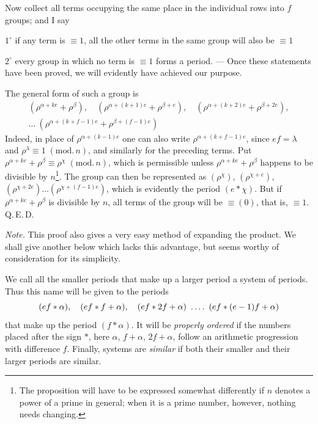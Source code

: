 Now collect all terms occupying the same place in the individual rows into $f$ groups; and I say
\par\noindent $1^\circ$ if any term is $\equiv1$, all the other terms in the same group will also be $\equiv1$

\noindent $2^\circ$ every group in which no term is $\equiv1$ forms a period. --- Once these statements have been proved, we will evidently have achieved our purpose.

The general form of such a group is
\[
\begin{gathered}
(\rho^{\alpha+ke}+\rho^\beta),\quad(\rho^{\alpha+(k+1)e}+\rho^{\beta+e}),\quad(\rho^{\alpha+(k+2)e}+\rho^{\beta+2e}),\\
\ldots\ (\rho^{\alpha+(k+f-1)e}+\rho^{\beta+(f-1)e})
\end{gathered}
\]
Indeed, in place of $\rho^{\alpha+(k-1)e}$ one can also write $\rho^{\alpha+(k+f-1)e}$, since $ef=\lambda$ and $\rho^\lambda\equiv1\;(\mathrm{mod.}\,n)$, and similarly for the preceding terms. Put $\rho^{\alpha+ke}+\rho^\beta\equiv\rho^\chi\;(\mathrm{mod.}\,n)$, which is permissible unless $\rho^{\alpha+ke}+\rho^\beta$ happens to be divisible by $n$\begingroup\renewcommand{\thefootnote}{*)}\footnote{The proposition will have to be expressed somewhat differently if $n$ denotes a power of a prime in general; when it is a prime number, however, nothing needs changing.}\endgroup. The group can then be represented as $(\rho^\chi)$, $(\rho^{\chi+e})$, $(\rho^{\chi+2e})\ldots(\rho^{\chi+(f-1)e})$, which is evidently the period $(e\ast\chi)$. But if $\rho^{\alpha+ke}+\rho^\beta$ is divisible by $n$, all terms of the group will be $\equiv(0)$, that is, $\equiv1$. Q.\,E.\,D.

\emph{Note.} This proof also gives a very easy method of expanding the product. We shall give another below which lacks this advantage, but seems worthy of consideration for its simplicity.

We call all the smaller periods that make up a larger period a system of periods. Thus this name will be given to the periods
\[
(ef\ast\alpha),\quad(ef\ast f+\alpha),\quad(ef\ast2f+\alpha)\ \dotsfour\ (ef\ast(e-1)f+\alpha)
\]
that make up the period $(f\ast\alpha)$. It will be \emph{properly ordered} if the numbers placed after the sign $\ast$, here $\alpha$, $f+\alpha$, $2f+\alpha$, follow an arithmetic progression with difference $f$. Finally, systems are \emph{similar} if both their smaller and their larger periods are similar.

